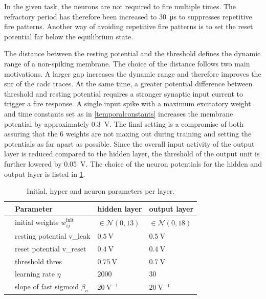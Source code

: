 In the given task, the neurons are not required to fire multiple times. The refractory period has therefore been increased to \SI{30}{\micro \s} to suppresses repetitive fire patterns. Another way of avoiding repetitive fire patterns is to set the reset potential far below the equilibrium state.

The distance between the resting potential and the threshold defines the dynamic range of a non-spiking membrane. The choice of the distance follows two main motivations. A larger gap increases the dynamic range and therefore improves the \gls{snr} of the \gls{cadc} traces. At the same time, a greater potential difference between threshold and resting potential requires a stronger synaptic input current to trigger a fire response. A single input spike with a maximum excitatory weight and time constants set as in \cref{temporalconstants} increases the membrane potential by approximately \SI{0.3}{\V}. The final setting is a compromise of both assuring that the \SI{6}{\bit} weights are not maxing out during training and setting the potentials as far apart as possible. Since the overall input activity of the output layer is reduced compared to the hidden layer, the threshold of the output unit is further lowered by \SI{0.05}{\V}. The choice of the neuron potentials for the hidden and output layer is listed in \cref{initparameters}.

\begin{table}[htb!]\centering{}
	\begin{tabular}{@{}rlll@{}}\toprule
		& Parameter								& 	hidden layer 			& 	output layer \\ \midrule
		& initial weights $w_{ij}^\text{init}$	& 	$\in \mathcal{N}(0,13)$ & 	$\in \mathcal{N}(0,18)$\\
		& resting potential \gls{v_leak}		&	$\SI{0.5}{\V}$ 			& 	$\SI{0.5}{\V}$\\
		& reset potential \gls{v_reset}			&	$\SI{0.4}{\V}$			& 	$\SI{0.4}{\V}$\\
		& threshold \gls{thres} 				&	$\SI{0.75}{\V}$			& 	$\SI{0.7}{\V}$\\
		& learning rate $\eta$ 					&	2000					& 	30			\\
		& slope of fast sigmoid $\beta_\sigma$ 	&	$\SI{20}{\V^{-1}}$		& 	$\SI{20}{\V^{-1}}$	\\
		\bottomrule
	\end{tabular}
	\caption[Initial, hyper and neuron parameters per layer.]{Initial, hyper and neuron parameters per layer.}
	\label{initparameters}
\end{table}

